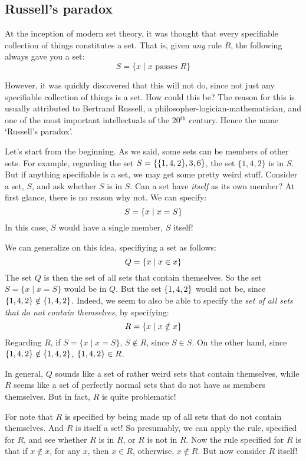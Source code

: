 \subsection{Russell's paradox}

At the inception of modern set theory, it was thought that every specifiable collection of things constitutes a set. That is, given \textit{any} rule $R$, the following always gave you a set:
\[
S=\{x \mid x \text{ passes }R\}
\]

However, it was quickly discovered that this will not do, since not just any specifiable collection of things is a set. How could this be? The reason for this is usually attributed to Bertrand Russell, a philosopher-logician-mathematician, and one of the most important intellectuals of the 20$^\text{th}$ century. Hence the name `Russell's paradox'.

Let's start from the beginning. As we said, some sets can be members of other sets. For example, regarding the set $S=\{\{1, 4, 2\}, 3, 6\}$, the set $\{1, 4, 2\}$ is in $S$. But if anything specifiable is a set, we may get some pretty weird stuff. Consider a set, $S$, and ask whether $S$ is in $S$. Can a set have \textit{itself} as its own member? At first glance, there is no reason why not. We can specify:
\[
S=\{x\mid x = S\}
\]
In this case, $S$ would have a single member, $S$ itself!

We can generalize on this idea, specifiying a set as follows:
\[
Q=\{x \mid x \in x\}
\]
The set $Q$ is then the set of all sets that contain themselves. So the set $S=\{x \mid x =S\}$ would be in $Q$. But the set $\{1, 4, 2\}$ would not be, since $\{1, 4, 2\} \notin \{1, 4, 2\}$. Indeed, we seem to also be able to specify the \textit{set of all sets that do not contain themselves}, by specifying:
\[
R=\{x \mid x \notin x\}
\]
Regarding $R$, if $S=\{x \mid x =S\}$, $S \notin R$, since $S \in S$. On the other hand, since $\{1, 4, 2\} \notin \{1, 4, 2\}$, $\{1, 4, 2\} \in R$. 

In general, $Q$ sounds like a set of rather weird sets that contain themselves, while $R$ seems like a set of perfectly normal sets that do not have as members themselves. But in fact, $R$ is quite problematic!

For note that $R$ is specified by being made up of all sets that do not contain themselves. And $R$ is itself a set! So presumably, we can apply the rule, specified for $R$, and see whether $R$ is in $R$, or $R$ is not in $R$. Now the rule specified for $R$ is that if $x \notin x$, for any $x$, then $x \in R$, otherwise, $x \notin R$. But now consider $R$ itself! 

